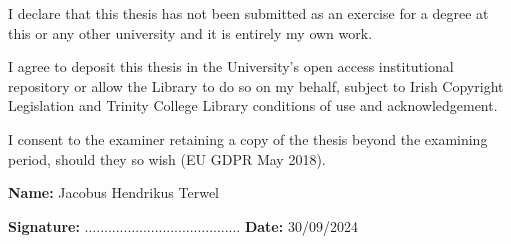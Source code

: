 \begin{declaration}      

%
%
%
I declare that this thesis has not been submitted as an exercise for a degree at this or any other university and it is entirely my own work. 

I agree to deposit this thesis in the University's open access institutional repository or allow the Library to do so on my behalf, subject to Irish Copyright Legislation and Trinity College Library conditions of use and acknowledgement.

I consent to the examiner retaining a copy of the thesis beyond the examining period, should they so wish (EU GDPR May 2018). 

\vspace{30mm}

\textbf{Name:} Jacobus Hendrikus Terwel

\vspace{15mm}

\textbf{Signature:}  ........................................		\textbf{Date:}  30/09/2024

\end{declaration}

